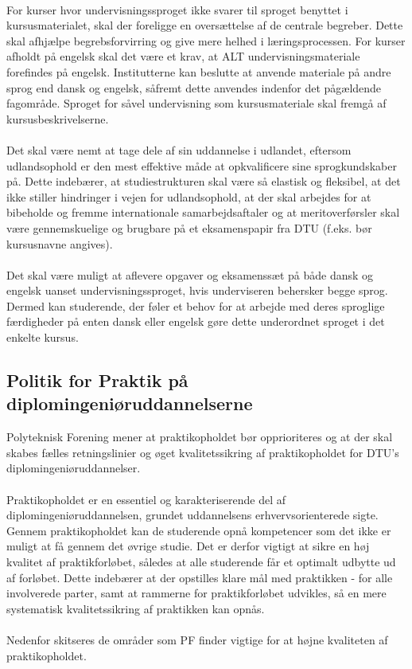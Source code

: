 \\
For kurser hvor undervisningssproget ikke svarer til sproget benyttet i kursusmaterialet, skal der foreligge en oversættelse af de centrale begreber. Dette skal afhjælpe begrebsforvirring og give mere helhed i læringsprocessen. For kurser afholdt på engelsk skal det være et krav, at ALT undervisningsmateriale forefindes på engelsk. Institutterne kan beslutte at anvende materiale på andre sprog end dansk og engelsk, såfremt dette anvendes indenfor det pågældende fagområde. Sproget for såvel undervisning som kursusmateriale skal fremgå af kursusbeskrivelserne.\\
\\
Det skal være nemt at tage dele af sin uddannelse i udlandet, eftersom udlandsophold er den mest effektive måde at opkvalificere sine sprogkundskaber på. Dette indebærer, at studiestrukturen skal være så elastisk og fleksibel, at det ikke stiller hindringer i vejen for udlandsophold, at der skal arbejdes for at bibeholde og fremme internationale samarbejdsaftaler og at meritoverførsler skal være gennemskuelige og brugbare på et eksamenspapir fra DTU (f.eks.
bør kursusnavne angives).\\
\\
Det skal være muligt at aflevere opgaver og eksamenssæt på både dansk og engelsk uanset undervisningssproget, hvis underviseren behersker begge sprog. Dermed kan studerende, der føler et behov for at arbejde med deres sproglige færdigheder på enten dansk eller engelsk gøre dette underordnet sproget i det enkelte kursus.

\subsection{Politik for Praktik på diplomingeniøruddannelserne}
Polyteknisk Forening mener at praktikopholdet bør opprioriteres og at der skal skabes fælles retningslinier og øget kvalitetssikring af praktikopholdet for DTU’s diplomingeniøruddannelser.\\
\\
Praktikopholdet er en essentiel og karakteriserende del af diplomingeniøruddannelsen, grundet uddannelsens erhvervsorienterede sigte. Gennem praktikopholdet kan de studerende opnå kompetencer som det ikke er muligt at få gennem det øvrige studie. Det er derfor vigtigt at sikre en høj kvalitet af praktikforløbet, således at alle studerende får et optimalt udbytte ud af forløbet. Dette indebærer at der opstilles klare mål med praktikken - for alle involverede parter, samt at rammerne for praktikforløbet udvikles, så en mere systematisk kvalitetssikring af praktikken kan opnås.\\
\\
Nedenfor skitseres de områder som PF finder vigtige for at højne kvaliteten af praktikopholdet.

